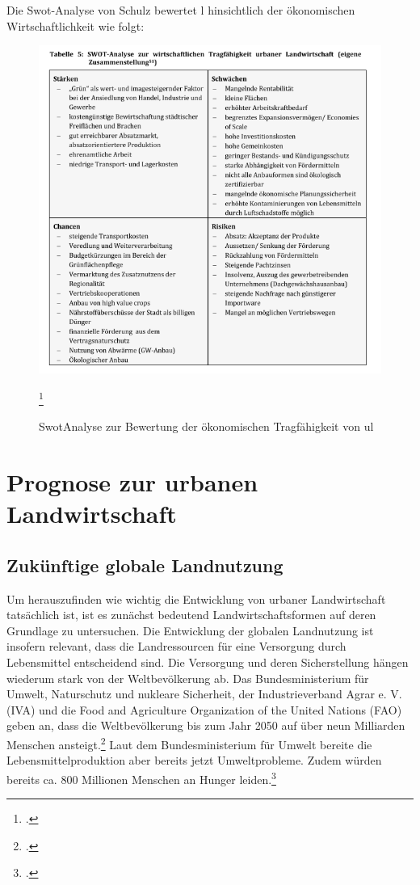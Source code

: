 \documentclass{scrartcl}
\begin{document}
 
 Die Swot-Analyse von Schulz bewertet l hinsichtlich der ökonomischen Wirtschaftlichkeit wie folgt:
 
\begin{figure}[htbp]
\centering
\includegraphics[width=14cm]{image_folder/swot_kSchulz.png}
\caption{SwotAnalyse zur Bewertung der ökonomischen Tragfähigkeit von \acs{ul}}
\label{fig:SwotUL}\footcite[S.32]{Schulz2013UrbaneLandmanagements}
\end{figure} 
 
\section{Prognose zur urbanen Landwirtschaft}


\subsection{Zukünftige globale Landnutzung}

Um herauszufinden wie wichtig die Entwicklung von urbaner Landwirtschaft tatsächlich ist, ist es zunächst bedeutend Landwirtschaftsformen auf deren Grundlage zu untersuchen. Die Entwicklung der globalen Landnutzung ist insofern relevant, dass die Landressourcen für eine Versorgung durch Lebensmittel entscheidend sind. Die Versorgung und deren Sicherstellung hängen wiederum stark von der Weltbevölkerung ab. Das Bundesministerium für Umwelt, Naturschutz und nukleare Sicherheit, der Industrieverband Agrar e. V. (IVA) und die Food and Agriculture Organization of the United Nations (FAO) geben an, dass die Weltbevölkerung bis zum Jahr 2050 auf über neun Milliarden Menschen ansteigt.\footcites[Vgl.]{BMU2016GlobaleUmweltfolgen}[sowie]{Agrar0NahrungsmittelLandwirtschaft}[und]{FAO2009How2050} Laut dem Bundesministerium für Umwelt bereite die Lebensmittelproduktion aber bereits jetzt Umweltprobleme. Zudem würden bereits ca. 800 Millionen Menschen an Hunger leiden.\footcite[Vgl.]{BMU2016GlobaleUmweltfolgen} 
\end{document}
